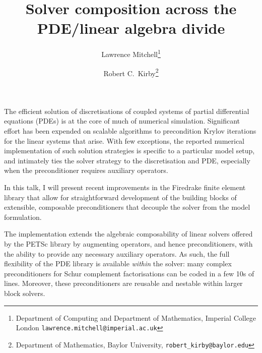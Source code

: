 \documentclass{article}
\begin{document}
\title{Solver composition across the PDE/linear algebra divide}
\author{%
  Lawrence Mitchell\thanks{Department of Computing and Department of
    Mathematics, Imperial College London
    \texttt{lawrence.mitchell@imperial.ac.uk}}
  \and
  Robert C.~Kirby\thanks{Department of Mathematics, Baylor University,
    \texttt{robert\_kirby@baylor.edu}}
}
\maketitle

The efficient solution of discretisations of coupled systems of
partial differential equations (PDEs) is at the core of much of
numerical simulation.  Significant effort has been expended on
scalable algorithms to precondition Krylov iterations for the linear
systems that arise.  With few exceptions, the reported numerical
implementation of such solution strategies is specific to a particular
model setup, and intimately ties the solver strategy to the
discretisation and PDE, especially when the preconditioner requires
auxiliary operators.

In this talk, I will present recent improvements in the Firedrake
finite element library that allow for
straightforward development of the building blocks of extensible,
composable preconditioners that decouple the solver from the model
formulation.

The implementation extends the algebraic composability of linear
solvers offered by the PETSc library by augmenting operators, and
hence preconditioners, with the ability to provide any necessary
auxiliary operators.  As such, the full flexibility of the PDE library
is available \emph{within} the solver: many complex preconditioners
for Schur complement factorisations can be coded in a few 10s of
lines.  Moreover, these preconditioners are reusable and nestable
within larger block solvers.
\end{document}
